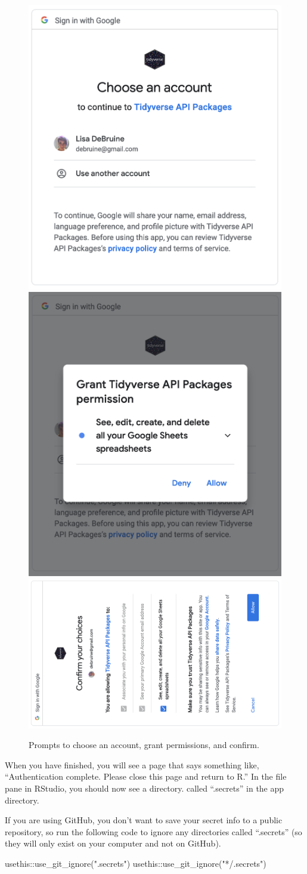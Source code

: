 \documentclass[
]{book}
\newenvironment{Shaded}{\begin{snugshade}}{\end{snugshade}}
\newcommand{\FunctionTok}[1]{\textcolor[rgb]{0.00,0.00,0.00}{#1}}
\newcommand{\NormalTok}[1]{#1}
\newcommand{\SpecialCharTok}[1]{\textcolor[rgb]{0.00,0.00,0.00}{#1}}
\newcommand{\StringTok}[1]{\textcolor[rgb]{0.31,0.60,0.02}{#1}}
\begin{document}
\begin{figure}

{\centering \includegraphics[width=0.3\linewidth]{images/gs4_choose_account} \includegraphics[width=0.3\linewidth]{images/gs4_auth} \includegraphics[width=0.3\linewidth]{images/gs4_confirm_auth} 

}

\caption{Prompts to choose an account, grant permissions, and confirm.}\label{fig:gs4-auth}
\end{figure}

When you have finished, you will see a page that says something like, ``Authentication complete. Please close this page and return to R.'' In the file pane in RStudio, you should now see a directory. called ``.secrets'' in the app directory.

If you are using GitHub, you don't want to save your secret info to a public repository, so run the following code to ignore any directories called ``.secrets'' (so they will only exist on your computer and not on GitHub).

\begin{Shaded}
\begin{Highlighting}[]
\NormalTok{usethis}\SpecialCharTok{::}\FunctionTok{use\_git\_ignore}\NormalTok{(}\StringTok{".secrets"}\NormalTok{)}
\NormalTok{usethis}\SpecialCharTok{::}\FunctionTok{use\_git\_ignore}\NormalTok{(}\StringTok{"*/.secrets"}\NormalTok{)}
\end{Highlighting}
\end{Shaded}
\end{document}
